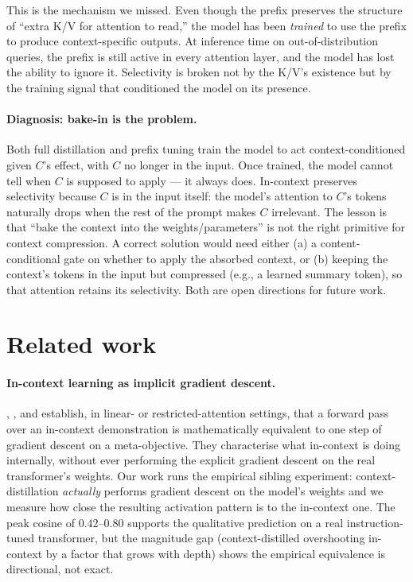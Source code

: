 \documentclass[letterpaper]{article} %
\begin{document}
This is the mechanism we missed. Even though the prefix preserves the
structure of ``extra K/V for attention to read,'' the model has been
\emph{trained} to use the prefix to produce context-specific outputs.
At inference time on out-of-distribution queries, the prefix is still
active in every attention layer, and the model has lost the ability to
ignore it. Selectivity is broken not by the K/V's existence but by the
training signal that conditioned the model on its presence.

\paragraph{Diagnosis: bake-in is the problem.}
Both full distillation and prefix tuning train the model to act
context-conditioned given $C$'s effect, with $C$ no longer in the
input. Once trained, the model cannot tell when $C$ is supposed to
apply --- it always does. In-context preserves selectivity because
$C$ is in the input itself: the model's attention to $C$'s tokens
naturally drops when the rest of the prompt makes $C$ irrelevant.
The lesson is that ``bake the context into the weights/parameters''
is not the right primitive for context compression. A correct
solution would need either (a) a content-conditional gate on whether
to apply the absorbed context, or (b) keeping the context's tokens
in the input but compressed (e.g., a learned summary token), so that
attention retains its selectivity. Both are open directions for future
work.

\section{Related work}
\label{sec:related}

\paragraph{In-context learning as implicit gradient descent.}
\citet{vonoswald2023transformers}, \citet{akyurek2023learning}, and
\citet{garg2022what} establish, in linear- or restricted-attention
settings, that a forward pass over an in-context demonstration is
mathematically equivalent to one step of gradient descent on a
meta-objective. They characterise what in-context is doing internally,
without ever performing the explicit gradient descent on the real
transformer's weights. Our work runs the empirical sibling experiment:
context-distillation \emph{actually} performs gradient descent on the
model's weights and we measure how close the resulting activation
pattern is to the in-context one. The peak cosine of $0.42$--$0.80$
supports the qualitative prediction on a real instruction-tuned
transformer, but the magnitude gap (context-distilled overshooting
in-context by a factor that grows with depth) shows the empirical
equivalence is directional, not exact.
\end{document}
